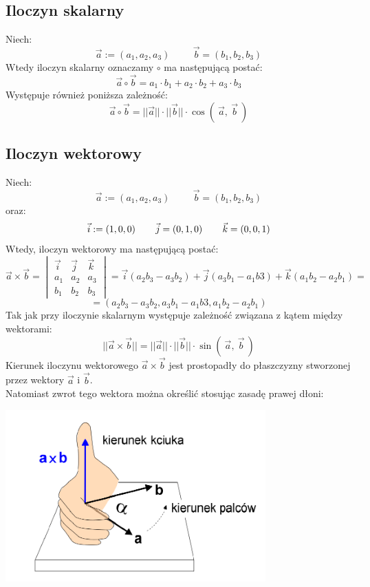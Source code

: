 \documentclass[a4paper]{article}
\begin{document}
    \subsection{\LARGE Iloczyn skalarny}
        \Large 
        Niech:
        \[\vec{a} := (a_1, a_2, a_3) \hspace{1cm} \vec{b} = (b_1, b_2, b_3) \]
        Wtedy iloczyn skalarny oznaczamy $\circ$ ma następującą postać:
        \[\vec{a} \circ \vec{b} = a_1 \cdot b_1 + a_2 \cdot b_2 + a_3 \cdot b_3\]
        Występuje również poniższa zależność:
         \[\vec{a} \circ \vec{b} = ||\vec{a}|| \cdot ||\vec{b}|| \cdot \cos{(\ \vec{a},\ {\vec{b}}\ )} \]
        
    \subsection{\LARGE Iloczyn wektorowy}
        \Large 
        Niech:
        \[\vec{a} := (a_1, a_2, a_3) \hspace{1cm} \vec{b} = (b_1, b_2, b_3) \]
        oraz:      
        \[\vec{i} := (1, 0, 0) \hspace{0,75cm} \vec{j} = (0, 1, 0) \hspace{0,75cm} \vec{k} = (0, 0, 1) \]
        Wtedy, iloczyn wektorowy ma następującą postać:
        \[
            \vec{a} \times \vec{b} = 
            \begin{vmatrix}
                \vec{i} & \vec{j} & \vec{k} \\
                a_1 & a_2 & a_3 \\
                b_1 & b_2 & b_3
            \end{vmatrix}
            = \vec{i}(a_2b_3 - a_3b_2) + \vec{j}(a_3b_1 - a_1b3) + \vec{k}(a_1b_2 - a_2b_1) =     
        \]
        \[ = (a_2b_3 - a_3b_2, a_3b_1 - a_1b3, a_1b_2 - a_2b_1 )\]
        Tak jak przy iloczynie skalarnym występuje zależność związana z kątem między wektorami:
        \[||\vec{a} \times \vec{b}|| = ||\vec{a}||\cdot ||\vec{b}|| \cdot \sin{(\ \vec{a},\ {\vec{b}}\ )}\]
        Kierunek iloczynu wektorowego $\vec{a} \times \vec{b}$ jest prostopadły do płaszczyzny 
        stworzonej przez wektory $\vec{a}$ i $\vec{b}$.\\ Natomiast zwrot tego wektora można określić stosując zasadę prawej dłoni: \\
        \begin{center}
            \includegraphics[width=10cm]{prawareka.png} 
        \end{center}
        
\end{document}
